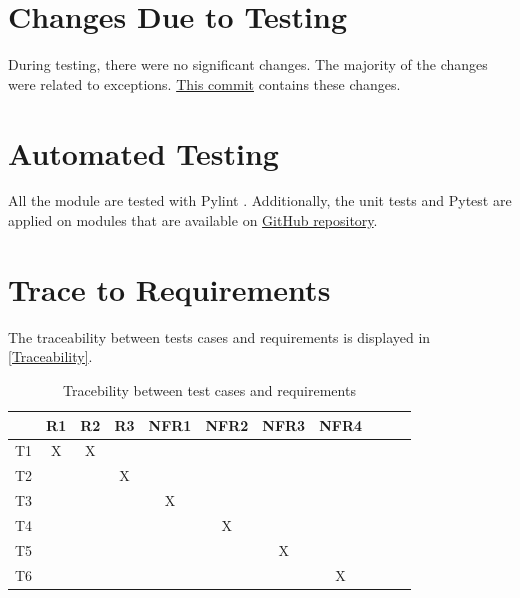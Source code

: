 \documentclass[12pt, titlepage]{article}
\begin{document}
\section{Changes Due to Testing}

During testing, there were no significant changes. 
The majority of the changes were related to exceptions. 
\href{https://github.com/tanya-jp/ANN-CAS741/commit/80cba12a28de6732807168bea3d07c342d0dbc4c}{This commit}
contains these changes.

\section{Automated Testing}

All the module are tested with Pylint \citep{pylint}.
Additionally, the unit tests and Pytest \citep{pytest} are 
applied on modules that are available on 
\href{https://github.com/tanya-jp/ANN-CAS741/tree/main/test}{GitHub repository}.
		
\section{Trace to Requirements}
The traceability between tests cases and requirements is displayed in \autoref{Traceability}.

\begin{table}[h!]
  \begin{center}
  \begin{tabular}{ |l|c|c|c|c|c|c|c|c|c|c}
  \hline
   & R1 & R2 & R3 & NFR1 & NFR2 & NFR3 & NFR4\\
  \hline
  T1 & X & X & & & & &\\
  \hline
  T2 & & & X & & & &\\
  \hline
  T3 & & & & X & &  & \\
  \hline
  T4 & & & & & X & & \\
  \hline
  T5 & & & & & & X &\\
  \hline
  T6 & & & & & & & X\\
  \hline
  \end{tabular}
  \caption{Tracebility between test cases and requirements}
  \label{Traceability}
  \end{center}
  \end{table}
		
\end{document}
